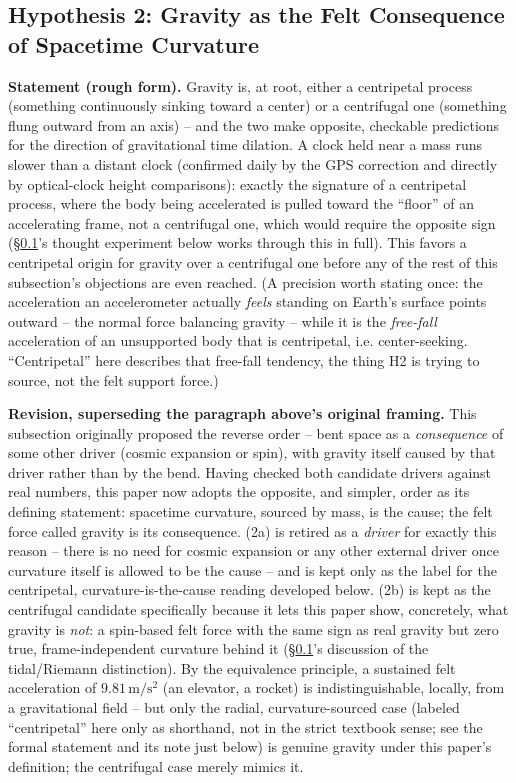 \documentclass[12pt, a4paper]{article}
\begin{document}
\subsection{Hypothesis 2: Gravity as the Felt Consequence of Spacetime Curvature}
\label{subsec:h2}
\textbf{Statement (rough form).} Gravity is, at root, either a
centripetal process (something continuously sinking toward a center)
or a centrifugal one (something flung outward from an axis) -- and
the two make opposite, checkable predictions for the direction of
gravitational time dilation. A clock held near a mass runs slower
than a distant clock (confirmed daily by the GPS correction and
directly by optical-clock height comparisons): exactly the signature
of a centripetal process, where the body being accelerated is pulled
toward the ``floor'' of an accelerating frame, not a centrifugal one,
which would require the opposite sign (\S\ref{subsec:h2}'s thought
experiment below works through this in full). This favors a
centripetal origin for gravity over a centrifugal one before any of
the rest of this subsection's objections are even reached. (A
precision worth stating once: the acceleration an accelerometer
actually \emph{feels} standing on Earth's surface points outward --
the normal force balancing gravity -- while it is the
\emph{free-fall} acceleration of an unsupported body that is
centripetal, i.e. center-seeking. ``Centripetal'' here describes that
free-fall tendency, the thing H2 is trying to source, not the felt
support force.)

\textbf{Revision, superseding the paragraph above's original framing.}
This subsection originally proposed the reverse order -- bent space as
a \emph{consequence} of some other driver (cosmic expansion or spin),
with gravity itself caused by that driver rather than by the bend.
Having checked both candidate drivers against real numbers, this
paper now adopts the opposite, and simpler, order as its defining
statement: spacetime curvature, sourced by mass, is the cause; the
felt force called gravity is its consequence. (2a) is retired as a
\emph{driver} for exactly this reason -- there is no need for
cosmic expansion or any other external driver once curvature itself
is allowed to be the cause -- and is kept only as the label for the
centripetal, curvature-is-the-cause reading developed below. (2b)
is kept as the centrifugal candidate specifically because it lets
this paper show, concretely, what gravity is \emph{not}: a spin-based
felt force with the same sign as real gravity but zero true,
frame-independent curvature behind it (\S\ref{subsec:h2}'s discussion
of the tidal/Riemann distinction). By the equivalence principle, a
sustained felt acceleration of $9.81\,\mathrm{m/s^2}$ (an elevator, a
rocket) is indistinguishable, locally, from a gravitational field --
but only the radial, curvature-sourced case (labeled ``centripetal''
here only as shorthand, not in the strict textbook sense; see the
formal statement and its note just below) is genuine gravity under
this paper's definition; the centrifugal case merely mimics it.
\end{document}
